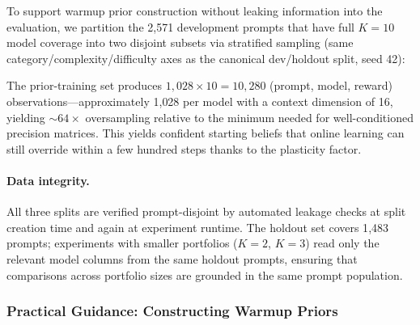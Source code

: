 To support warmup prior construction without leaking information into the evaluation, we partition the 2{,}571 development prompts that have full $K{=}10$ model coverage into two disjoint subsets via stratified sampling (same category/complexity/difficulty axes as the canonical dev/holdout split, seed 42):

\begin{table}[htbp]
\centering
\caption{Three-way data split for all experiments.}
\label{tab:three_way_split}
\small
{}
\end{table}

The prior-training set produces $1{,}028 \times 10 = 10{,}280$ (prompt, model, reward) observations---approximately 1{,}028 per model with a context dimension of 16, yielding ${\sim}64\times$ oversampling relative to the minimum needed for well-conditioned precision matrices.
This yields confident starting beliefs that online learning can still override within a few hundred steps thanks to the plasticity factor.

\paragraph{Data integrity.}
All three splits are verified prompt-disjoint by automated leakage checks at split creation time and again at experiment runtime.
The holdout set covers 1{,}483 prompts; experiments with smaller portfolios ($K{=}2$, $K{=}3$) read only the relevant model columns from the same holdout prompts, ensuring that comparisons across portfolio sizes are grounded in the same prompt population.

\subsubsection{Practical Guidance: Constructing Warmup Priors}
\label{sec:prior_guidance}


